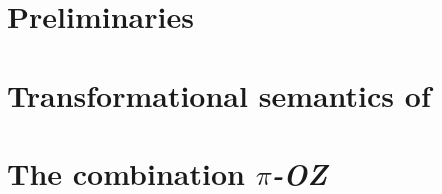 \chapter{Preliminaries}
\label{chp_preliminaries}


\chapter{Transformational semantics of \oz{}}
\label{chp_tra_sem_oz}


\chapter{The combination \emph{$\pi$-OZ}}
\label{chp_tra_sem_oz}
